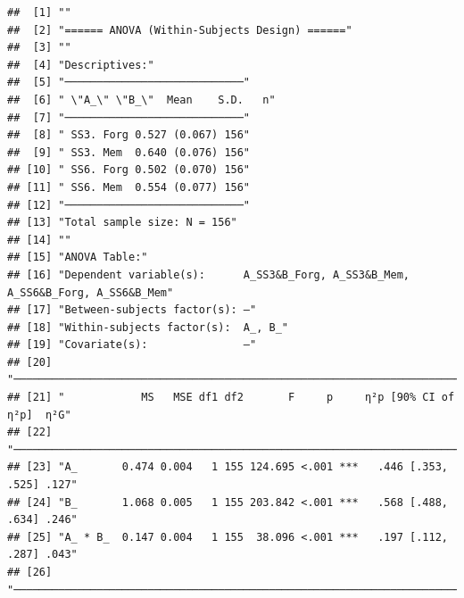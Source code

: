 \documentclass[
  man]{apa6}
\begin{document}
\begin{verbatim}
##  [1] ""                                                                                       
##  [2] "====== ANOVA (Within-Subjects Design) ======"                                           
##  [3] ""                                                                                       
##  [4] "Descriptives:"                                                                          
##  [5] "────────────────────────────"                                                           
##  [6] " \"A_\" \"B_\"  Mean    S.D.   n"                                                       
##  [7] "────────────────────────────"                                                           
##  [8] " SS3. Forg 0.527 (0.067) 156"                                                           
##  [9] " SS3. Mem  0.640 (0.076) 156"                                                           
## [10] " SS6. Forg 0.502 (0.070) 156"                                                           
## [11] " SS6. Mem  0.554 (0.077) 156"                                                           
## [12] "────────────────────────────"                                                           
## [13] "Total sample size: N = 156"                                                             
## [14] ""                                                                                       
## [15] "ANOVA Table:"                                                                           
## [16] "Dependent variable(s):      A_SS3&B_Forg, A_SS3&B_Mem, A_SS6&B_Forg, A_SS6&B_Mem"       
## [17] "Between-subjects factor(s): –"                                                          
## [18] "Within-subjects factor(s):  A_, B_"                                                     
## [19] "Covariate(s):               –"                                                          
## [20] "───────────────────────────────────────────────────────────────────────"                
## [21] "            MS   MSE df1 df2       F     p     η²p [90% CI of η²p]  η²G"                
## [22] "───────────────────────────────────────────────────────────────────────"                
## [23] "A_       0.474 0.004   1 155 124.695 <.001 ***   .446 [.353, .525] .127"                
## [24] "B_       1.068 0.005   1 155 203.842 <.001 ***   .568 [.488, .634] .246"                
## [25] "A_ * B_  0.147 0.004   1 155  38.096 <.001 ***   .197 [.112, .287] .043"                
## [26] "───────────────────────────────────────────────────────────────────────"                

\end{verbatim}
\end{document}
